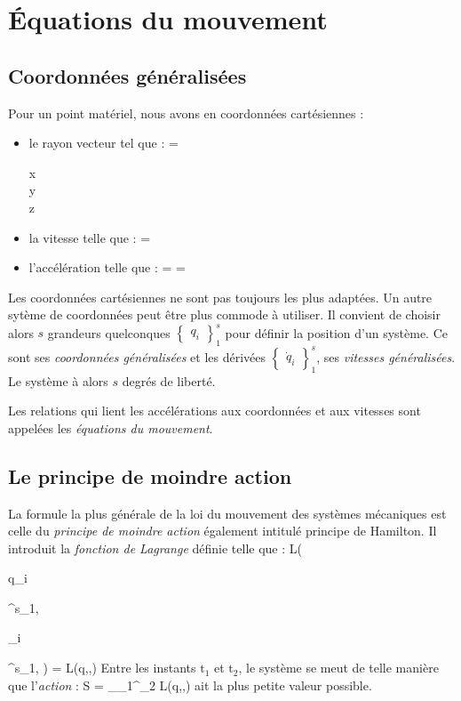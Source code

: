 \chapter{\'Equations du mouvement}
\section{Coordonn\'ees g\'en\'eralis\'ees}

Pour un point mat\'eriel, nous avons en coordonn\'ees cart\'esiennes :
\begin{itemize}
\item le rayon vecteur tel que :
	\benn
		 = \begin{pmatrix} x \\ y \\ z \end{pmatrix}
	\eenn
\item la vitesse telle que :
	\benn
		 = 
	\eenn
\item l'acc\'el\'eration telle que :
	\benn
		 =  = 
	\eenn
\end{itemize}

Les coordonn\'ees cart\'esiennes ne sont pas toujours les plus adapt\'ees. Un autre syt\`eme de coordonn\'ees peut \^etre plus commode \`a utiliser. Il convient de choisir alors $s$ grandeurs quelconques $\begin{Bmatrix}q_{i}\end{Bmatrix}^{s}_{1}$ pour d\'efinir la position d'un syst\`eme. Ce sont ses \emph{coordonn\'ees g\'en\'eralis\'ees} et les d\'eriv\'ees $\begin{Bmatrix}\dot{q}_{i}\end{Bmatrix}^{s}_{1}$, ses \emph{vitesses g\'en\'eralis\'ees}. Le syst\`{e}me \`{a} alors $s$ degr\'{e}s de libert\'{e}.

Les relations qui lient les acc\'el\'erations aux coordonn\'ees et aux vitesses sont appel\'ees les \emph{\'equations du mouvement}.

\section{Le principe de moindre action}

La formule la plus g\'en\'erale de la loi du mouvement des syst\`emes mécaniques est celle du \emph{principe de moindre action} \'{e}galement intitul\'{e} principe de Hamilton. Il introduit la \emph{fonction de Lagrange} d\'efinie telle que :
\benn
	L(\begin{Bmatrix}q_{i}\end{Bmatrix}^{s}_{1},\begin{Bmatrix}_{i}\end{Bmatrix}^{s}_{1}, ) = L(q,,)
\eenn
Entre les instants $\mathrm{t}_{1}$ et $\mathrm{t}_{2}$, le système se meut de telle mani\`ere que l'\emph{action} :
\be
	S = \int_{_{1}}^{_{2}} L(q,,)  \label{EQ:2_1}
\ee
ait la plus petite valeur possible.

